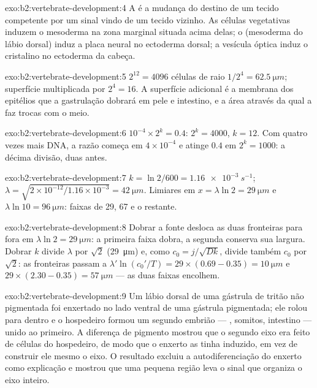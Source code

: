 \begin{solution}{exo:b2:vertebrate-development:4}
A  é a mudança do destino de um tecido competente por um sinal
vindo de um tecido vizinho. As células vegetativas induzem o mesoderma
na zona marginal situada acima delas; o  (mesoderma do lábio
dorsal) induz a placa neural no ectoderma dorsal; a vesícula óptica
induz o cristalino no ectoderma da cabeça.
\end{solution}

\begin{solution}{exo:b2:vertebrate-development:5}
$2^{12} = 4096$ células de raio $1/2^{4} = \qty{62.5}{\micro m}$;
superfície multiplicada por $2^{4} = 16$. A superfície adicional é a
membrana dos epitélios que a gastrulação dobrará em pele e intestino,
e a área através da qual a  faz trocas com o meio.
\end{solution}

\begin{solution}{exo:b2:vertebrate-development:6}
$10^{-4}\times 2^{k} = 0.4$: $2^{k} = 4000$, $k = 12$. Com quatro
vezes mais DNA, a razão começa em $4\times 10^{-4}$ e atinge $0.4$ em
$2^{k} = 1000$: a décima divisão, duas antes.
\end{solution}

\begin{solution}{exo:b2:vertebrate-development:7}
$k = \ln 2/600 = \qty{1.16e-3}{s^{-1}}$; $\lambda = \sqrt{2\times
10^{-12}/1.16\times 10^{-3}} = \qty{42}{\micro m}$. Limiares em
$x = \lambda\ln 2 = \qty{29}{\micro m}$ e $\lambda\ln 10 =
\qty{96}{\micro m}$: faixas de 29, 67 e o restante.
\end{solution}

\begin{solution}{exo:b2:vertebrate-development:8}
Dobrar a fonte desloca as duas fronteiras para fora em $\lambda\ln
2 = \qty{29}{\micro m}$: a primeira faixa dobra, a segunda conserva sua
largura. Dobrar $k$ divide $\lambda$ por $\sqrt 2$
(\qty{29}{\micro m}) e, como $c_0 = j/\sqrt{Dk}$, divide também $c_0$
por $\sqrt 2$: as fronteiras passam a $\lambda'\ln(c_0'/T) =
29\times(0.69 - 0.35) = \qty{10}{\micro m}$ e $29\times(2.30 -
0.35) = \qty{57}{\micro m}$ --- as duas faixas encolhem.
\end{solution}

\begin{solution}{exo:b2:vertebrate-development:9}
Um lábio dorsal de uma gástrula de tritão não pigmentada foi enxertado
no lado ventral de uma gástrula pigmentada; ele rolou para dentro e o
hospedeiro formou um segundo embrião --- , somitos,
intestino --- unido ao primeiro. A diferença de pigmento mostrou que o
segundo eixo era feito de células do hospedeiro, de modo que o enxerto
as tinha induzido, em vez de construir ele mesmo o eixo. O resultado
excluiu a autodiferenciação do enxerto como explicação e mostrou que
uma pequena região leva o sinal que organiza o eixo inteiro.
\end{solution}


